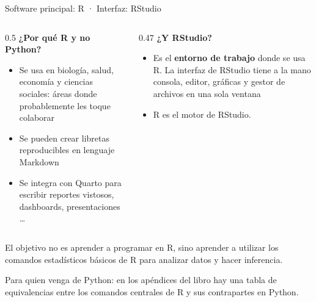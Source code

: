 \documentclass[aspectratio=169,10pt]{beamer}
\newcommand{\destaca}[1]{%
  \par\vspace{3pt}\noindent
  \colorbox{azulClaro}{%
    \parbox{\dimexpr\linewidth-2\fboxsep\relax}{\vspace{3pt}#1\vspace{3pt}}}%
  \par\vspace{3pt}}
\begin{document}
\begin{frame}{Software principal: R · Interfaz: RStudio}
  \begin{columns}[T]
    \begin{column}{0.5\textwidth}
      \textbf{¿Por qué R y no Python?}
      \begin{itemize}
        \item Se usa en biología, salud, economía y ciencias sociales:
          áreas donde probablemente les toque colaborar
        \item Se pueden crear libretas reproducibles en lenguaje Markdown
        \item Se integra con Quarto para escribir reportes vistosos, dashboards, presentaciones \dots
      \end{itemize}
      \vspace{0.2cm}
    \end{column}
    \begin{column}{0.47\textwidth}
      \textbf{¿Y RStudio?}
      \begin{itemize}
        \item Es el \textbf{entorno de trabajo} donde se usa R. La interfaz de RStudio tiene a la mano consola, editor,
        gráficas y gestor de archivos en una sola ventana
        \item R es el motor de RStudio.
      \end{itemize}
      \raggedright
    \end{column}
  \end{columns}
      \destaca{ El objetivo no es aprender a programar en R, sino aprender a utilizar los comandos estadísticos básicos de R para analizar datos y hacer inferencia.}
  \vspace{0.3cm}
  {\footnotesize Para quien venga de Python: en los apéndices del libro hay una tabla de
  equivalencias entre los comandos centrales de R y sus contrapartes en Python.}
\end{frame}
\end{document}
